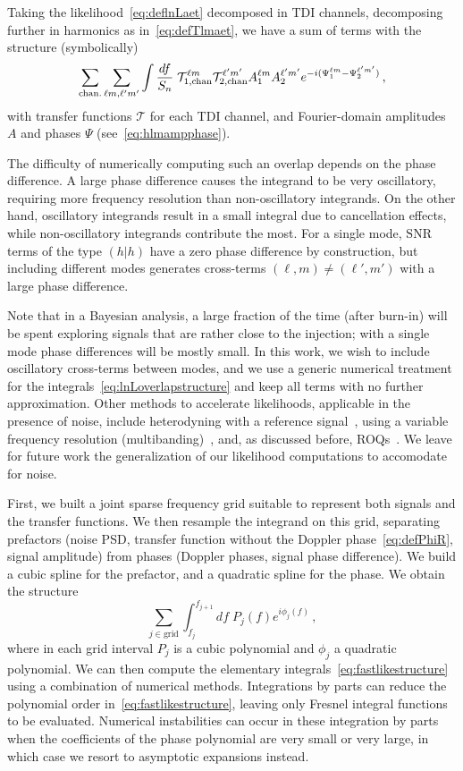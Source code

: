 \documentclass[aps,showpacs,twocolumn,prd,superscriptaddress,nofootinbib]{revtex4-1}
\newcommand{\be}{\begin{equation}}
\newcommand{\ee}{\end{equation}}
\newcommand\calT{{\mathcal{T}}}
\begin{document}
Taking the likelihood~\eqref{eq:deflnLaet} decomposed in TDI channels, decomposing further in harmonics as in~\eqref{eq:defTlmaet}, we have a sum of terms with the structure (symbolically)
\be
	\sum_{\rm chan.}\sum_{\ell m, \ell'm'}\int \frac{df}{S_{n}} \; \calT_{1, \mathrm{chan}}^{\ell m} \calT_{2, \mathrm{chan}}^{\ell' m'} A_{1}^{\ell m} A_{2}^{\ell' m'} e^{-i(\Psi_{1}^{\ell m} - \Psi_{2}^{\ell' m'})} \,,
\ee
with transfer functions $\calT$ for each TDI channel, and Fourier-domain amplitudes $A$ and phases $\Psi$ (see~\eqref{eq:hlmampphase}).

The difficulty of numerically computing such an overlap depends on the phase difference.
A large phase difference causes the integrand to be very oscillatory, requiring more frequency resolution than non-oscillatory integrands.
On the other hand, oscillatory integrands result in a small integral due to cancellation effects, while non-oscillatory integrands contribute the most.
For a single mode, $\mathrm{SNR}$ terms of the type $(h|h)$ have a zero phase difference by construction, but including different modes generates cross-terms $(\ell, m) \neq (\ell', m')$ with a large phase difference.

Note that in a Bayesian analysis, a large fraction of the time (after burn-in) will be spent exploring signals that are rather close to the injection; with a single mode phase differences will be mostly small. In this work, we wish to include oscillatory cross-terms between modes, and we use a generic numerical treatment for the integrals~\eqref{eq:lnLoverlapstructure} and keep all terms with no further approximation. Other methods to accelerate likelihoods, applicable in the presence of noise, include heterodyning with a reference signal~\cite{Cornish10}, using a variable frequency resolution (multibanding)~\cite{Porter14, Vinciguerra+17}, and, as discussed before, ROQs~\cite{Smith+14, Canizares+14, Smith+16}. We leave for future work the generalization of our likelihood computations to accomodate for noise. 

First, we built a joint sparse frequency grid suitable to represent both signals and the transfer functions. We then resample the integrand on this grid, separating prefactors (noise PSD, transfer function without the Doppler phase~\eqref{eq:defPhiR}, signal amplitude) from phases (Doppler phases, signal phase difference). We build a cubic spline for the prefactor, and a quadratic spline for the phase. We obtain the structure
\be\label{eq:fastlikestructure}
	\sum_{j \in \mathrm{grid}} \int_{f_{j}}^{f_{j+1}} df \; P_{j} (f) e^{i \phi_{j} (f)} \,,
\ee
where in each grid interval $P_{j}$ is a cubic polynomial and $\phi_{j}$ a quadratic polynomial. We can then compute the elementary integrals~\eqref{eq:fastlikestructure} using a combination of numerical methods. Integrations by parts can reduce the polynomial order in~\eqref{eq:fastlikestructure}, leaving only Fresnel integral functions to be evaluated. Numerical instabilities can occur in these integration by parts when the coefficients of the phase polynomial are very small or very large, in which case we resort to asymptotic expansions instead.
\end{document}
